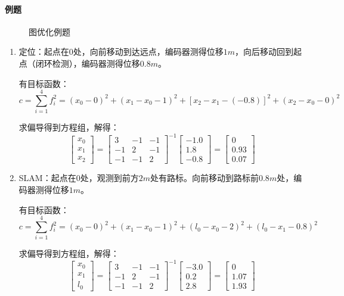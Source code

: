 \documentclass[
12pt, %
a4paper, 
oneside, %
headinclude,footinclude, %
]{scrartcl}
\begin{document}
\paragraph{例题}
\begin{figure}[H]
\centering
{} \quad
{}
\caption{图优化例题}
\end{figure}

\begin{enumerate}
\item 定位：起点在$ 0 $处，向前移动到达远点，编码器测得位移$ 1m $，向后移动回到起点（闭环检测），编码器测得位移$ 0.8m $。

有目标函数：
$$ c = \sum_{i = 1}^{4} f_i^2 = (x_0 - 0)^2 + (x_1 - x_0 - 1)^2 + [x_2 - x_1 -(-0.8)]^2 +(x_2 - x_0 - 0)^2 $$

求偏导得到方程组，解得：
$$
\begin{bmatrix}  x_0 \\ x_1 \\ x_2 \end{bmatrix} 
= \begin{bmatrix} 3 & -1 & -1 \\ -1 & 2 & -1 \\ -1 & -1 & 2 \end{bmatrix}^{-1}
\begin{bmatrix} -1.0 \\ 1.8 \\ -0.8 \end{bmatrix} 
= \begin{bmatrix} 0 \\ 0.93 \\ 0.07 \end{bmatrix}
$$
\item SLAM：起点在$ 0 $处，观测到前方$ 2m $处有路标。向前移动到路标前$ 0.8m $处，编码器测得位移$ 1m $。

有目标函数：
$$ c = \sum_{i = 1}^{4} f_i^2 = (x_0 - 0)^2 + (x_1 - x_0 - 1)^2 + (l_0 - x_0 - 2)^2 +(l_0 - x_1 - 0.8)^2 $$

求偏导得到方程组，解得：
$$
\begin{bmatrix}  x_0 \\ x_1 \\ l_0 \end{bmatrix} 
= \begin{bmatrix} 3 & -1 & -1 \\ -1 & 2 & -1 \\ -1 & -1 & 2 \end{bmatrix}^{-1}
\begin{bmatrix} -3.0 \\ 0.2 \\ 2.8 \end{bmatrix} 
= \begin{bmatrix} 0 \\ 1.07 \\ 1.93 \end{bmatrix}
$$
\end{enumerate}
\end{document}
